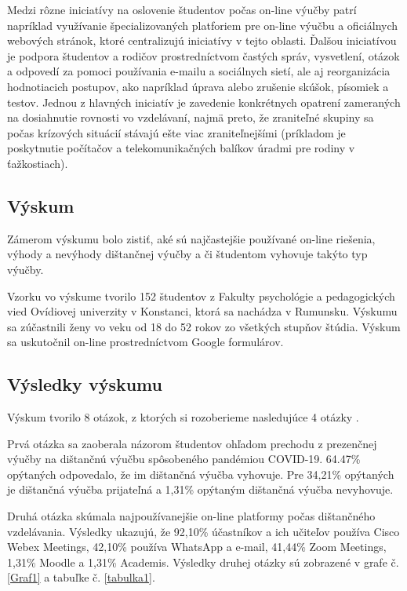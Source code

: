 \documentclass[10pt,oneside,slovak,a4paper]{article}
\begin{document}
Medzi rôzne iniciatívy na oslovenie študentov počas on-line výučby patrí napríklad využívanie špecializovaných platforiem pre on-line výučbu a oficiálnych webových stránok,
ktoré centralizujú iniciatívy v tejto oblasti. Ďalšou iniciatívou je podpora študentov a rodičov prostredníctvom častých správ, vysvetlení, otázok a odpovedí za pomoci používania e-mailu a sociálnych sietí,
ale aj reorganizácia hodnotiacich postupov, ako napríklad úprava alebo zrušenie skúšok, písomiek a testov. Jednou z hlavných iniciatív je zavedenie konkrétnych opatrení zameraných na dosiahnutie rovnosti vo vzdelávaní,
najmä preto, že zraniteľné skupiny sa počas krízových situácií stávajú ešte viac zraniteľnejšími (príkladom je poskytnutie počítačov a telekomunikačných balíkov úradmi pre rodiny v ťažkostiach).  %

\subsection{Výskum}
Zámerom výskumu bolo zistiť, aké sú najčastejšie používané on-line riešenia, výhody a nevýhody dištančnej výučby a či študentom vyhovuje takýto typ výučby. \cite{covid19} 

Vzorku vo výskume tvorilo 152 študentov z Fakulty psychológie a pedagogických vied Ovídiovej univerzity v Konstanci, ktorá sa nachádza v Rumunsku.
Výskumu sa zúčastnili ženy vo veku od 18 do 52 rokov zo všetkých stupňov štúdia.
Výskum sa uskutočnil on-line prostredníctvom Google formulárov. 

\subsection{Výsledky výskumu}
Výskum tvorilo 8 otázok, z ktorých si rozoberieme nasledujúce 4 otázky \cite{covid19}.

Prvá otázka sa zaoberala názorom študentov ohľadom prechodu z prezenčnej výučby na dištančnú výučbu spôsobeného pandémiou COVID-19.
64.47\% opýtaných odpovedalo, že im dištančná výučba vyhovuje. Pre 34,21\% opýtaných je dištančná výučba prijateľná a 1,31\% opýtaným dištančná výučba nevyhovuje.

Druhá otázka skúmala najpoužívanejšie on-line platformy počas dištančného vzdelávania.
Výsledky ukazujú, že 92,10\% účastníkov a ich učiteľov používa Cisco Webex Meetings, 42,10\% používa WhatsApp a e-mail, 41,44\% Zoom Meetings, 1,31\% Moodle a 1,31\% Academis.
Výsledky druhej otázky sú zobrazené v grafe č. \ref{Graf1} a tabuľke č. \ref{tabulka1}.
\end{document}
